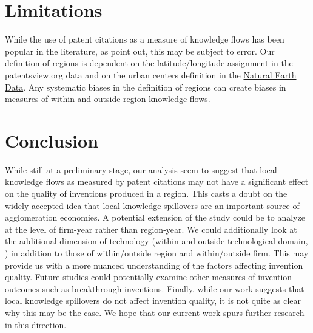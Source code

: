 \documentclass[parskip=full,10pt,letterpaper]{article}
\begin{document}
\section*{Limitations}
While the use of patent citations as a measure of knowledge flows has been popular in the literature, as \cite{Arora2017} point out, this may be subject to error. Our definition of regions is dependent on the latitude/longitude assignment in the patentsview.org data and on the urban centers definition in the \href{http://www.naturalearthdata.com/downloads/10m-cultural-vectors/}{Natural Earth Data}. Any systematic biases in the definition of regions can create biases in measures of within and outside region knowledge flows. \par

\section*{Conclusion}
While still at a preliminary stage, our analysis seem to suggest that local knowledge flows as measured by patent citations may not have a significant effect on the quality of inventions produced in a region. This casts a doubt on the widely accepted idea that local knowledge spillovers are an important source of agglomeration economies. A potential extension of the study could be to analyze at the level of firm-year rather than region-year. We could additionally look at the additional dimension of technology (within and outside technological domain, \cite{Rosenkopf2001}) in addition to those of within/outside region and within/outside firm. This may provide us with a more nuanced understanding of the factors affecting invention quality. Future studies could potentially examine other measures of invention outcomes such as breakthrough inventions. Finally, while our work suggests that local knowledge spillovers do not affect invention quality, it is not quite as clear why this may be the case. We hope that our current work spurs further research in this direction.  

\singlespacing
 

\newpage
\normalsize


\end{document}
